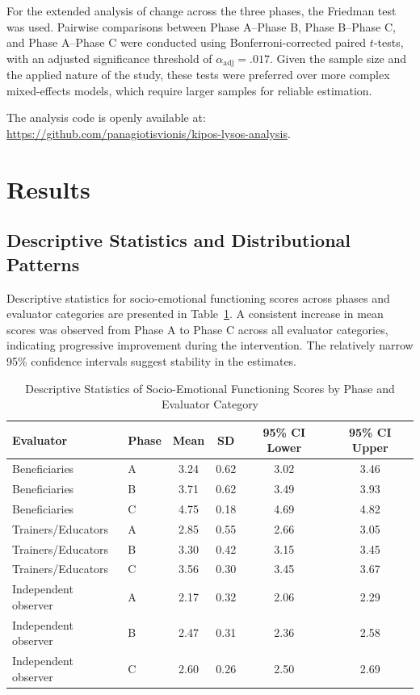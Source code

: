 \documentclass[journal]{IEEEtran}
\begin{document}
For the extended analysis of change across the three phases, the Friedman test was used. Pairwise comparisons between Phase A--Phase B, Phase B--Phase C, and Phase A--Phase C were conducted using Bonferroni-corrected paired $t$-tests, with an adjusted significance threshold of $\alpha_{\mathrm{adj}}=.017$. Given the sample size and the applied nature of the study, these tests were preferred over more complex mixed-effects models, which require larger samples for reliable estimation.

The analysis code is openly available at:
\url{https://github.com/panagiotisvionis/kipos-lysos-analysis}.


\section{Results}

\subsection{Descriptive Statistics and Distributional Patterns}

Descriptive statistics for socio-emotional functioning scores across phases and evaluator categories are presented in Table~\ref{tab:descriptive_statistics}. A consistent increase in mean scores was observed from Phase A to Phase C across all evaluator categories, indicating progressive improvement during the intervention. The relatively narrow 95\% confidence intervals suggest stability in the estimates.

\begin{table}[!t]
\caption{Descriptive Statistics of Socio-Emotional Functioning Scores by Phase and Evaluator Category}
\label{tab:descriptive_statistics}
\centering
\begin{tabular}{llcccc}
\hline
\textbf{Evaluator} & \textbf{Phase} & \textbf{Mean} & \textbf{SD} & \textbf{95\% CI Lower} & \textbf{95\% CI Upper} \\
\hline
Beneficiaries & A & 3.24 & 0.62 & 3.02 & 3.46 \\
Beneficiaries & B & 3.71 & 0.62 & 3.49 & 3.93 \\
Beneficiaries & C & 4.75 & 0.18 & 4.69 & 4.82 \\
Trainers/Educators & A & 2.85 & 0.55 & 2.66 & 3.05 \\
Trainers/Educators & B & 3.30 & 0.42 & 3.15 & 3.45 \\
Trainers/Educators & C & 3.56 & 0.30 & 3.45 & 3.67 \\
Independent observer & A & 2.17 & 0.32 & 2.06 & 2.29 \\
Independent observer & B & 2.47 & 0.31 & 2.36 & 2.58 \\
Independent observer & C & 2.60 & 0.26 & 2.50 & 2.69 \\
\hline
\end{tabular}
\end{table}
\end{document}
